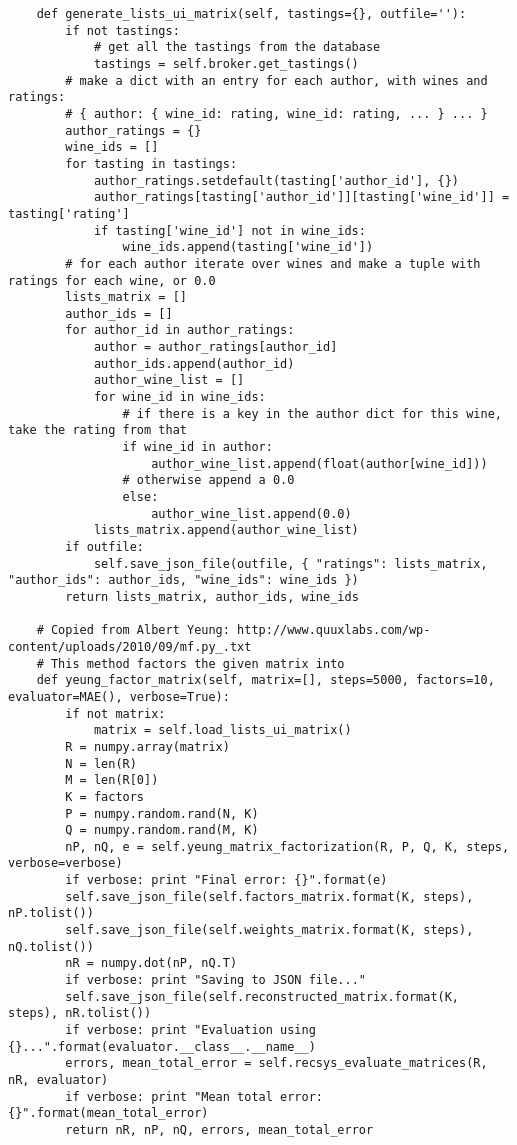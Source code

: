 \begin{verbatim}
    def generate_lists_ui_matrix(self, tastings={}, outfile=''):
        if not tastings:
            # get all the tastings from the database
            tastings = self.broker.get_tastings()
        # make a dict with an entry for each author, with wines and ratings:
        # { author: { wine_id: rating, wine_id: rating, ... } ... }
        author_ratings = {}
        wine_ids = []
        for tasting in tastings:
            author_ratings.setdefault(tasting['author_id'], {})
            author_ratings[tasting['author_id']][tasting['wine_id']] = tasting['rating']
            if tasting['wine_id'] not in wine_ids:
                wine_ids.append(tasting['wine_id'])
        # for each author iterate over wines and make a tuple with ratings for each wine, or 0.0
        lists_matrix = []
        author_ids = []
        for author_id in author_ratings:
            author = author_ratings[author_id]
            author_ids.append(author_id)
            author_wine_list = []
            for wine_id in wine_ids:
                # if there is a key in the author dict for this wine, take the rating from that
                if wine_id in author:
                    author_wine_list.append(float(author[wine_id]))
                # otherwise append a 0.0
                else:
                    author_wine_list.append(0.0)
            lists_matrix.append(author_wine_list)
        if outfile:
            self.save_json_file(outfile, { "ratings": lists_matrix, "author_ids": author_ids, "wine_ids": wine_ids })
        return lists_matrix, author_ids, wine_ids

    # Copied from Albert Yeung: http://www.quuxlabs.com/wp-content/uploads/2010/09/mf.py_.txt
    # This method factors the given matrix into
    def yeung_factor_matrix(self, matrix=[], steps=5000, factors=10, evaluator=MAE(), verbose=True):
        if not matrix:
            matrix = self.load_lists_ui_matrix()
        R = numpy.array(matrix)
        N = len(R)
        M = len(R[0])
        K = factors
        P = numpy.random.rand(N, K)
        Q = numpy.random.rand(M, K)
        nP, nQ, e = self.yeung_matrix_factorization(R, P, Q, K, steps, verbose=verbose)
        if verbose: print "Final error: {}".format(e)
        self.save_json_file(self.factors_matrix.format(K, steps), nP.tolist())
        self.save_json_file(self.weights_matrix.format(K, steps), nQ.tolist())
        nR = numpy.dot(nP, nQ.T)
        if verbose: print "Saving to JSON file..."
        self.save_json_file(self.reconstructed_matrix.format(K, steps), nR.tolist())
        if verbose: print "Evaluation using {}...".format(evaluator.__class__.__name__)
        errors, mean_total_error = self.recsys_evaluate_matrices(R, nR, evaluator)
        if verbose: print "Mean total error: {}".format(mean_total_error)
        return nR, nP, nQ, errors, mean_total_error


\end{verbatim}
